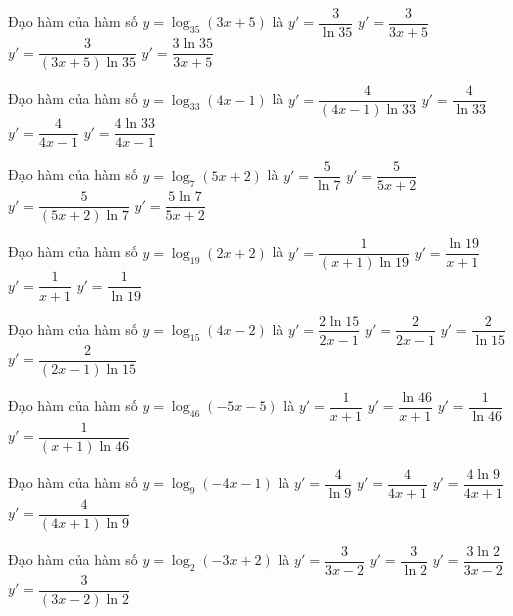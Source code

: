 \documentclass[12pt,a4paper]{article}
\begin{document}
\begin{ex}
Đạo hàm của hàm số $y=\log_{35}(3x+5)$ là
\choice
{$y'=\dfrac{3}{\ln{35}}$}
{$y'=\dfrac{3}{3x+5}$}
{\True $y'=\dfrac{3}{(3x+5)\ln 35}$}
{$y'=\dfrac{3\ln{35}}{3x+5}$}
\end{ex}
\begin{ex}
Đạo hàm của hàm số $y=\log_{33}(4x-1)$ là
\choice
{\True $y'=\dfrac{4}{(4x-1)\ln 33}$}
{$y'=\dfrac{4}{\ln{33}}$}
{$y'=\dfrac{4}{4x-1}$}
{$y'=\dfrac{4\ln{33}}{4x-1}$}
\end{ex}
\begin{ex}
Đạo hàm của hàm số $y=\log_7(5x+2)$ là
\choice
{$y'=\dfrac{5}{\ln{7}}$}
{$y'=\dfrac{5}{5x+2}$}
{\True $y'=\dfrac{5}{(5x+2)\ln 7}$}
{$y'=\dfrac{5\ln{7}}{5x+2}$}
\end{ex}
\begin{ex}
Đạo hàm của hàm số $y=\log_{19}(2x+2)$ là
\choice
{\True $y'=\dfrac{1}{(x+1)\ln 19}$}
{$y'=\dfrac{\ln{19}}{x+1}$}
{$y'=\dfrac{1}{x+1}$}
{$y'=\dfrac{1}{\ln{19}}$}
\end{ex}
\begin{ex}
Đạo hàm của hàm số $y=\log_{15}(4x-2)$ là
\choice
{$y'=\dfrac{2\ln{15}}{2x-1}$}
{$y'=\dfrac{2}{2x-1}$}
{$y'=\dfrac{2}{\ln{15}}$}
{\True $y'=\dfrac{2}{(2x-1)\ln 15}$}
\end{ex}
\begin{ex}
Đạo hàm của hàm số $y=\log_{46}(-5x-5)$ là
\choice
{$y'=\dfrac{1}{x+1}$}
{$y'=\dfrac{\ln{46}}{x+1}$}
{$y'=\dfrac{1}{\ln{46}}$}
{\True $y'=\dfrac{1}{(x+1)\ln 46}$}
\end{ex}
\begin{ex}
Đạo hàm của hàm số $y=\log_9(-4x-1)$ là
\choice
{$y'=\dfrac{4}{\ln{9}}$}
{$y'=\dfrac{4}{4x+1}$}
{$y'=\dfrac{4\ln{9}}{4x+1}$}
{\True $y'=\dfrac{4}{(4x+1)\ln 9}$}
\end{ex}
\begin{ex}
Đạo hàm của hàm số $y=\log_2(-3x+2)$ là
\choice
{$y'=\dfrac{3}{3x-2}$}
{$y'=\dfrac{3}{\ln{2}}$}
{$y'=\dfrac{3\ln{2}}{3x-2}$}
{\True $y'=\dfrac{3}{(3x-2)\ln 2}$}
\end{ex}
\end{document}
